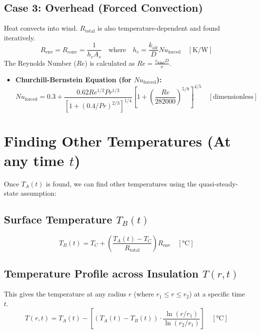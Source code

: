 \documentclass[11pt, a4paper]{article}
\begin{document}
\subsection{Case 3: Overhead (Forced Convection)}
Heat convects into wind. $R_{\text{total}}$ is also temperature-dependent and found iteratively.
\begin{equation}
    R_{\text{env}} = R_{\text{conv}} = \frac{1}{h_c A_s} \quad \text{where} \quad h_c = \frac{k_{\text{air}}}{D} Nu_{\text{forced}} \quad [\si{\kelvin\per\watt}]
\end{equation}
The Reynolds Number ($Re$) is calculated as $Re = \frac{v_{\text{wind}} D}{\nu}$.
\begin{itemize}
    \item \textbf{Churchill-Bernstein Equation (for $Nu_{\text{forced}}$):}
    \begin{equation}
        Nu_{\text{forced}} = 0.3 + \frac{0.62 Re^{1/2} Pr^{1/3}}{\left[1 + (0.4/Pr)^{2/3}\right]^{1/4}} \left[1 + \left(\frac{Re}{282000}\right)^{5/8}\right]^{4/5} \quad [\text{dimensionless}]
    \end{equation}
\end{itemize}

\section{Finding Other Temperatures (At any time $t$)}
Once $T_A(t)$ is found, we can find other temperatures using the quasi-steady-state assumption:

\subsection{Surface Temperature $T_B(t)$}
\begin{equation}
    T_B(t) = T_C + \left( \frac{T_A(t) - T_C}{R_{\text{total}}} \right) R_{\text{env}} \quad [\si{\celsius}]
\end{equation}

\subsection{Temperature Profile across Insulation $T(r, t)$}
This gives the temperature at any radius $r$ (where $r_1 \le r \le r_2$) at a specific time $t$.
\begin{equation}
    T(r, t) = T_A(t) - \left[ (T_A(t) - T_B(t)) \cdot \frac{\ln(r / r_1)}{\ln(r_2 / r_1)} \right] \quad [\si{\celsius}]
\end{equation}
\end{document}

